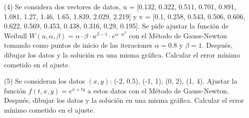 \noindent (4) Se considera dos vectores de datos, u = [0.132, 0.322, 0.511, 0.701, 0.891, 1.081, 1.27, 1.46, 1.65, 1.839, 2.029, 2.219] y v = [0.1, 0.258, 0.543, 0.506, 0.606, 0.622, 0.569, 0.453, 0.438, 0.316, 0.29, 0.195]. Se pide ajustar la función de Weibull $W(u, \alpha, \beta) = \alpha \cdot \beta \cdot u^{\beta - 1} \cdot e^{\alpha \cdot u^\beta}$ con el Método de Gauss-Newton tomando como puntos de inicio de las iteraciones $\alpha = 0.8$ y $\beta = 1$. Después, dibujar los datos y la solución en una misma gráfica. Calcular el error mínimo cometido en el ajuste.

\noindent (5) Se consideran los datos $(x, y)$: (-2, 0.5), (-1, 1), (0, 2), (1, 4). Ajustar la función $f(t, x, y) = e^{x + ty}$ a estos datos con el Método de Gauss-Newton. Después, dibujar los datos y la solución en una misma gráfica. Calcular el error mínimo cometido en el ajuste.